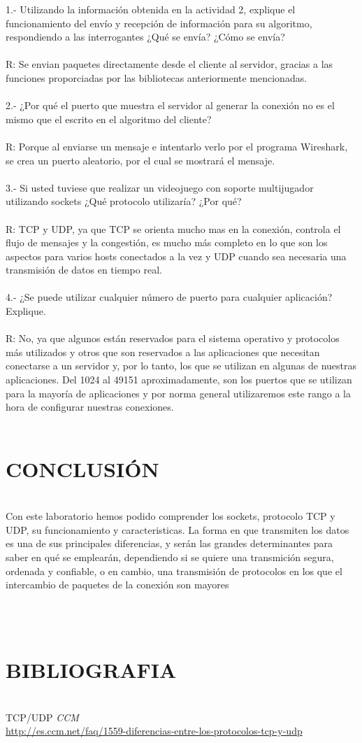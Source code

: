 \documentclass[onecolumn,12pt]{IEEEtran}
\begin{document}
1.- Utilizando la información obtenida en la actividad 2, explique el funcionamiento del envío y recepción de información para su algoritmo, respondiendo a las interrogantes ¿Qué se envía? ¿Cómo se envía?\\ \\
R: Se envian paquetes directamente desde el cliente al servidor, gracias a las funciones proporciadas por las bibliotecas anteriormente mencionadas.
\\ \\
2.- ¿Por qué el puerto que muestra el servidor al generar la conexión no es el mismo que el escrito en el
algoritmo del cliente?\\ \\
R: Porque al enviarse un mensaje e intentarlo verlo por el programa Wireshark, se crea un puerto aleatorio, por el cual se mostrará el mensaje.
\\ \\
3.- Si usted tuviese que realizar un videojuego con soporte multijugador utilizando sockets ¿Qué protocolo
utilizaría? ¿Por qué?\\ \\
R: TCP y UDP, ya que TCP se orienta mucho mas en la conexión, controla el flujo de mensajes y la congestión, es mucho más completo en lo que son los aspectos para varios hosts conectados a la vez y UDP cuando sea necesaria una transmisión de datos en tiempo real.
\\ \\
4.- ¿Se puede utilizar cualquier número de puerto para cualquier aplicación? Explique.\\ \\
R: No, ya que algunos están reservados para el sistema operativo y protocolos más utilizados y otros que son reservados a las aplicaciones que necesitan conectarse a un servidor y, por lo tanto, los que se utilizan en algunas de nuestras aplicaciones. Del 1024 al 49151 aproximadamente, son los puertos que se utilizan para la mayoría de aplicaciones y por norma general utilizaremos este rango a la hora de configurar nuestras conexiones.
\\ \\

\newpage
\section{CONCLUSIÓN}
\hfill \\

Con este laboratorio hemos podido comprender los sockets, protocolo TCP y UDP, su funcionamiento y caracteristicas. La forma en que transmiten los datos es una de sus principales diferencias, y serán las grandes determinantes para saber en qué se emplearán, dependiendo si se quiere una transmición segura, ordenada  y confiable, o en cambio, una transmisión de protocolos en los que el intercambio de paquetes de la conexión son mayores

\hfill \\
\hfill \\
\section{BIBLIOGRAFIA}
\hfill \\
TCP/UDP 
\emph{CCM} \\
\url{http://es.ccm.net/faq/1559-diferencias-entre-los-protocolos-tcp-y-udp}
\end{document}
